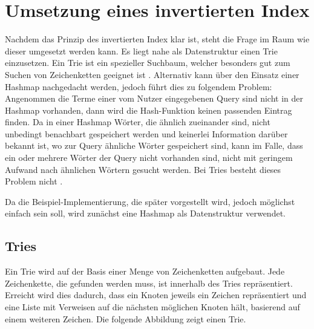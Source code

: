 \section{Umsetzung eines invertierten Index}
Nachdem das Prinzip des invertierten Index klar ist, steht die Frage im Raum wie dieser umgesetzt werden kann.
Es liegt nahe als Datenstruktur einen Trie einzusetzen. Ein Trie ist ein spezieller Suchbaum, welcher besonders gut zum Suchen von Zeichenketten geeignet ist \cite{IR_Intro_Cambridge}.
\newline
Alternativ kann über den Einsatz einer Hashmap nachgedacht werden, jedoch führt dies zu folgendem Problem:
Angenommen die Terme einer vom Nutzer eingegebenen Query sind nicht in der Hashmap vorhanden, dann wird die Hash-Funktion keinen passenden Eintrag finden. Da in einer Hashmap Wörter, die ähnlich zueinander sind, nicht unbedingt benachbart gespeichert werden und keinerlei Information darüber bekannt ist, wo zur Query ähnliche Wörter gespeichert sind, kann im Falle, dass ein oder mehrere Wörter der Query nicht vorhanden sind, nicht mit geringem Aufwand nach ähnlichen Wörtern gesucht werden. Bei Tries besteht dieses Problem nicht \cite{IR_Intro_Cambridge}. 
\newline

Da die Beispiel-Implementierung, die später vorgestellt wird, jedoch möglichst einfach sein soll, wird zunächst eine Hashmap als Datenstruktur verwendet. 

\subsection{Tries}
Ein Trie wird auf der Basis einer Menge von Zeichenketten aufgebaut. Jede Zeichenkette, die gefunden werden muss, ist innerhalb des Tries repräsentiert.
\newline
Erreicht wird dies dadurch, dass ein Knoten jeweils ein Zeichen repräsentiert und eine Liste mit Verweisen auf die nächsten möglichen Knoten hält, basierend auf einem weiteren Zeichen.
Die folgende Abbildung zeigt einen Trie.

